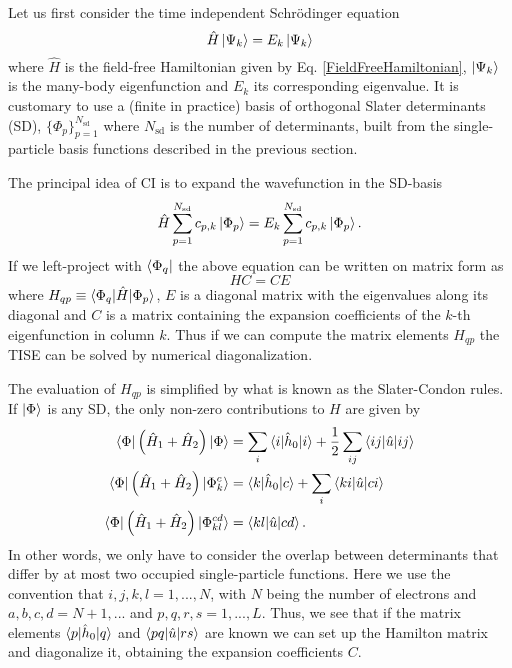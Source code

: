 \documentclass[a4paper,10pt, twocolumn]{article}
\begin{document}
Let us first consider the time independent Schrödinger equation 
\begin{equation}
 \hat{H} \ket{\Psi_k} = E_k \ket{\Psi_k}
\end{equation}
where $\hat{H}$ is the field-free Hamiltonian given by Eq. \eqref{FieldFreeHamiltonian}, $\ket{\Psi_k}$ is the many-body eigenfunction and $E_k$ its corresponding eigenvalue. It is customary 
to use a (finite in practice) basis of orthogonal Slater determinants (SD), $\{ \Phi_p \}_{p=1}^{N_{\text{sd}}}$ where $N_{\text{sd}}$ is the number of determinants, built from the single-particle basis functions described in the previous section. 

The principal idea of CI is to expand the wavefunction in the SD-basis
\begin{equation}
 \hat{H} \sum_{p=1}^{N_{\text{sd}}} c_{p,k} \ket{\Phi_p} = E_k \sum_{p=1}^{N_{\text{sd}}} c_{p,k} \ket{\Phi_p}.
\end{equation}
If we left-project with $\bra{\Phi_q}$ the above equation can be written on matrix form as 
\begin{equation}
 HC = CE
\end{equation}
where $H_{qp} \equiv \braket{\Phi_q|\hat{H}|\Phi_p}$, $E$ is a diagonal matrix with the eigenvalues along its diagonal and $C$ is a matrix containing the expansion coefficients of the 
$k$-th eigenfunction in column $k$. Thus if we can compute the matrix elements $H_{qp}$ the TISE can be solved by numerical diagonalization.

The evaluation of $H_{qp}$ is simplified by what is known as the Slater-Condon rules. If $\ket{\Phi}$ is any SD, 
the only non-zero contributions to $H$ are given by
\begin{align}
 \braket{\Phi| \left(\hat{H}_1 + \hat{H}_2\right)|\Phi} &= \sum_i \braket{i|\hat{h}_0|i} + \frac{1}{2}\sum_{ij}\braket{ij|\hat{u}|ij} \label{SlaterCondonEqual}\\
 \braket{\Phi| \left(\hat{H}_1 + \hat{H}_2\right)|\Phi_k^c} &= \braket{k|\hat{h}_0|c} + \sum_{i} \braket{ki|\hat{u}|ci} \label{SlaterCondonDiffByOne} \\
 \braket{\Phi| \left(\hat{H}_1 + \hat{H}_2\right)|\Phi_{kl}^{cd}} &= \braket{kl|\hat{u}|cd} \label{SlaterCondonDiffByTwo}.
\end{align}
In other words, we only have to consider the overlap between determinants that differ by at most two occupied single-particle functions. 
Here we use the convention that $i,j,k,l = 1,...,N$, with $N$ being the number of electrons and $a,b,c,d = N+1,...$ and $p,q,r,s = 1,...,L$. Thus, 
we see that if the matrix elements $\braket{p|\hat{h}_0|q}$ and $\braket{pq|\hat{u}|rs}$ are known we can set up the Hamilton matrix and diagonalize it, obtaining the expansion coefficients $C$.
\end{document}
